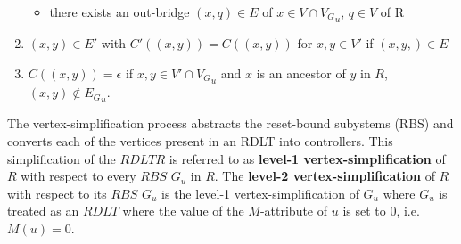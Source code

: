 \documentclass[12pt]{article}
\begin{document}
\begin{definition}
\begin{enumerate}
\begin{itemize}
                        \item there exists an out-bridge \begin{math}(x,q) \in E\end{math} of \begin{math}x \in V \cap {V_G}_u\end{math}, \begin{math}q \in V\end{math} of R
                        
                    \end{itemize}

                \item \begin{math}(x,y) \in E'\end{math} with \begin{math}C'((x,y)) = C((x,y))\end{math} for \begin{math}x,y \in V'\end{math} if \begin{math}(x,y,) \in E\end{math}

                \item \begin{math}C((x,y)) = \epsilon\end{math} if \begin{math}x,y \in V' \cap {V_G}_u\end{math} and \begin{math}x\end{math} is an ancestor of \begin{math}y\end{math} in \begin{math}R\end{math}, \begin{math}(x,y) \notin {E_G}_u\end{math}.
                
            \end{enumerate}
        
        \end{definition}

        The vertex-simplification process abstracts the reset-bound subystems (RBS) and converts each of the vertices present in an RDLT into controllers. This simplification of the $RDLT R$ is referred to as \textbf{level-1 vertex-simplification} of $R$ with respect to every $RBS$ $G_{u}$ in $R$. The \textbf{level-2 vertex-simplification} of $R$ with respect to its $RBS$ $G_{u}$ is the level-1 vertex-simplification of $G_{u}$ where $G_{u}$ is treated as an $RDLT$ where the value of the $M$-attribute of $u$ is set to $0$, i.e. $M(u) = 0$.
\end{document}
